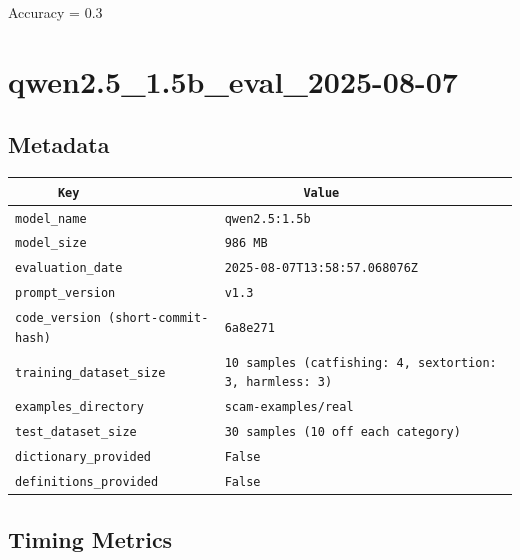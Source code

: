 \documentclass{article}
\begin{document}
\begin{center}
Accuracy = 0.3
\end{center}

\section{qwen2.5\_1.5b\_eval\_2025-08-07}
\subsection{Metadata}

\begin{center}
\begin{tabular}{l | l} \hline
    \verb|      Key      | & \verb|           Value           | \\ \hline
    \hline
    \verb|model_name    | & \verb|qwen2.5:1.5b                 | \\ \hline
    \verb|model_size    | & \verb|986 MB                       | \\ \hline
    \verb|evaluation_date| & \verb|2025-08-07T13:58:57.068076Z  | \\ \hline
    \verb|prompt_version| & \verb|v1.3                         | \\ \hline
    \verb|code_version (short-commit-hash)| & \verb|6a8e271                      | \\ \hline
    \verb|training_dataset_size| & \verb|10 samples (catfishing: 4, sextortion: 3, harmless: 3)| \\ \hline
    \verb|examples_directory| & \verb|scam-examples/real           | \\ \hline
    \verb|test_dataset_size| & \verb|30 samples (10 off each category)| \\ \hline
    \verb|dictionary_provided| & \verb|False                        | \\ \hline
    \verb|definitions_provided| & \verb|False                        | \\ \hline
\end{tabular}
\end{center}

\subsection{Timing Metrics}
\end{document}
